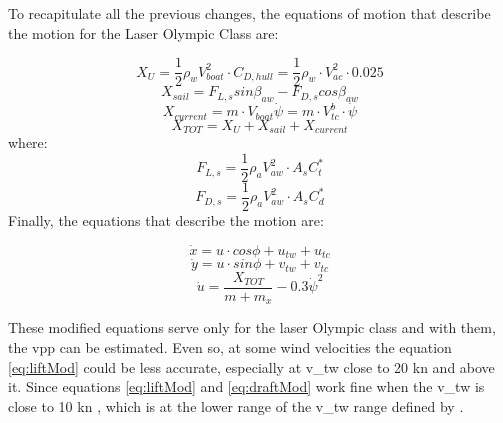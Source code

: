 To recapitulate all the previous changes, the equations of motion that describe the motion for the Laser Olympic Class are: \par 
\begin{equation} \label{eq:X_uM}
    X_{U}=\frac{1}{2}\rho_{w}V_{boat}^2 \cdot C_{D,hull}=\frac{1}{2}\rho_{w} \cdot V_{ac}^2 \cdot 0.025 
\end{equation}
\begin{equation}\label{eq:X_sailM}
       X_{sail}=F_{L,s}sin\beta_{aw}-F_{D,s}cos\beta_{aw} 
\end{equation}
\begin{equation}\label{eq:Forces_M} 
     X_{current}=m\cdot V_{boat} \Dot{\psi}= m\cdot V_{tc}^b \cdot \Dot{\psi}
\end{equation}
\begin{equation}\label{eq:X_TOTM}
    X_{TOT}=X_{U}+X_{sail}+X_{current}
\end{equation}
where:
\begin{equation} \label{eq:SailLiftM}
    F_{L,s}=\frac{1}{2}\rho_{a}V_{aw}^2 \cdot A_{s} C_{t}^*
\end{equation}
\begin{equation} \label{eq:SailDragM}
    F_{D,s}=\frac{1}{2}\rho_{a}V_{aw}^2 \cdot A_{s} C_{d}^*
\end{equation}
Finally, the equations that describe the motion are:\par
\begin{equation}\label{eq:x_dotM}
\Dot{x}=u \cdot cos\phi + u_{tw} + u_{tc}
\end{equation}
\begin{equation}\label{eq:y_dotM}
\Dot{y}=u \cdot sin\phi + v_{tw} + v_{tc}
\end{equation}
\begin{equation} \label{eq:u_dotLaserMR}
    \Dot{u}=\frac{X_{TOT}}{m+m_{x}}- 0.3 \Dot{\psi}^2
\end{equation}

These modified equations serve only for the laser Olympic class and with them, the \acrshort{vpp} can be estimated. Even so, at some wind velocities the %
equation \ref{eq:liftMod} %
could be less accurate, especially at \acrshort{v_tw} close to 20 kn and above it. Since equations \ref{eq:liftMod} and \ref{eq:draftMod} work fine when the \acrshort{v_tw} is close to 10 kn \cite{day2017performance}, which is at the lower range of the \acrshort{v_tw} range defined by \cite{laser_opt}. \par 

